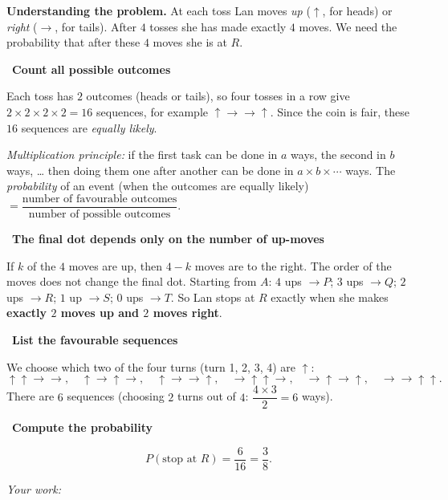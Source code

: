 \documentclass[11pt]{article}
\newif\ifsol \solfalse
\newcommand{\probsol}[1]{%
  \begin{lrbox}{\solmeasure}\begin{minipage}{\dimexpr\linewidth-24pt\relax}#1\end{minipage}\end{lrbox}%
  \ifsol
    \begin{solbox}#1\end{solbox}%
  \else
    \setlength{\solht}{\dimexpr\ht\solmeasure+\dp\solmeasure+0.85cm\relax}%
    \ifdim\solht<1.35cm\setlength{\solht}{1.35cm}\fi
    \ifdim\solht>\StudentMaxWork\setlength{\solht}{\StudentMaxWork}\fi
    \begin{tcolorbox}[colback=white,colframe=Line,boxrule=0.8pt,arc=5pt,
      left=8pt,right=8pt,top=4pt,bottom=4pt,height=\solht]{\footnotesize\color{Slate}\itshape\WorkWord}\end{tcolorbox}%
  \fi}
\newlength{\StudentMaxWork}\setlength{\StudentMaxWork}{7.5cm}
\newcommand{\step}[2]{\par\smallskip\noindent{\bfseries\color{tmBlue!85!black}\StepWord~#1.}\ {\bfseries #2}\par\nopagebreak}
\def\WorkWord{Your work:}
\def\StepWord{Step}
\begin{document}
\probsol{
\textbf{Understanding the problem.} At each toss Lan moves \emph{up} ($\uparrow$, for heads) or \emph{right}
($\rightarrow$, for tails). After $4$ tosses she has made exactly $4$ moves. We need the probability that after these
$4$ moves she is at $R$.

\step{1}{Count all possible outcomes}
Each toss has $2$ outcomes (heads or tails), so four tosses in a row give
$2\times2\times2\times2=16$ sequences, for example $\uparrow\rightarrow\rightarrow\uparrow$.
Since the coin is fair, these $16$ sequences are \emph{equally likely}.
\begin{recallbox}\emph{Multiplication principle:} if the first task can be done in $a$ ways, the second in $b$ ways, \dots{} then
doing them one after another can be done in $a\times b\times\cdots$ ways. The \emph{probability} of an event (when the outcomes
are equally likely) $=\dfrac{\text{number of favourable outcomes}}{\text{number of possible outcomes}}$.\end{recallbox}

\step{2}{The final dot depends only on the number of up-moves}
If $k$ of the $4$ moves are up, then $4-k$ moves are to the right. The order of the moves does not change the final dot.
Starting from $A$: $4$ ups $\to P$; $3$ ups $\to Q$; $2$ ups $\to R$; $1$ up $\to S$; $0$ ups $\to T$.
So Lan stops at $R$ exactly when she makes \textbf{exactly $2$ moves up and $2$ moves right}.

\step{3}{List the favourable sequences}
We choose which two of the four turns (turn 1, 2, 3, 4) are $\uparrow$:
\[\uparrow\uparrow\rightarrow\rightarrow,\quad \uparrow\rightarrow\uparrow\rightarrow,\quad
\uparrow\rightarrow\rightarrow\uparrow,\quad \rightarrow\uparrow\uparrow\rightarrow,\quad
\rightarrow\uparrow\rightarrow\uparrow,\quad \rightarrow\rightarrow\uparrow\uparrow.\]
There are $6$ sequences (choosing $2$ turns out of $4$: $\dfrac{4\times3}{2}=6$ ways).

\step{4}{Compute the probability}
\[P(\text{stop at } R)=\frac{6}{16}=\frac38.\]

}
\end{document}

